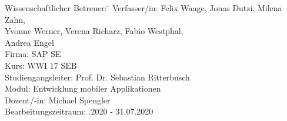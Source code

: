 \begin{titlepage}
\begin{center}
\begin{minipage}{\textwidth}
\begin{tabbing}
	Wissenschaftlicher Betreuer: \hspace{0.85cm}\=\kill
	Verfasser/in: \> Felix Waage, Jonas Dutzi, Milena Zahn, \\ \> Yvonne Werner, Verena Richarz, Fabio Westphal,\\ \> Andrea Engel \\[1.5mm]
	Firma: \> SAP SE \\[1.5mm]
	Kurs: \> WWI 17 SEB\\[1.5mm]
	Studiengangsleiter: \> Prof. Dr. Sebastian Ritterbusch  \\[1.5mm]
	Modul: \> Entwicklung mobiler Applikationen \\[1.5mm]
	Dozent/-in: \> Michael Spengler \\[1.5mm]
	Bearbeitungszeitraum: .2020 - 31.07.2020
	
\end{tabbing}
\end{minipage}

\end{center}

\end{titlepage}